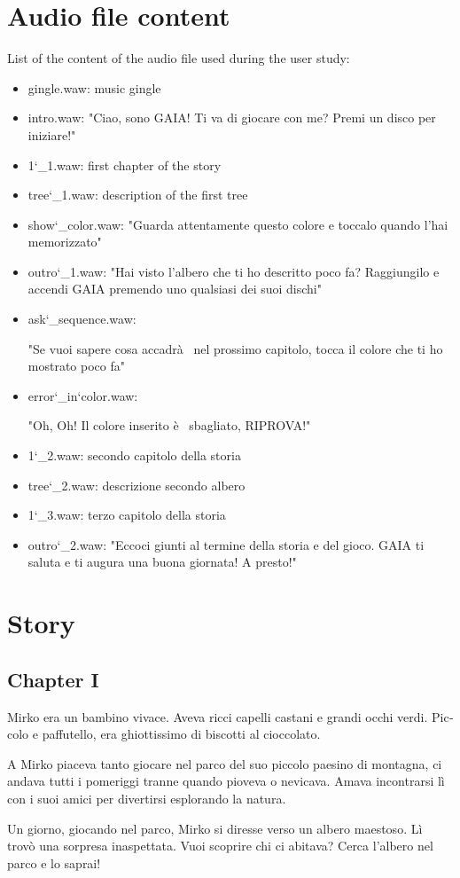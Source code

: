 \documentclass[a4paper,11pt]{report}
\begin{document}
\section{Audio file content}
List of the content of the audio file used during the user study:
\begin{itemize}
\item gingle.waw: music gingle
\item intro.waw: "Ciao, sono GAIA! Ti va di giocare con me? Premi un disco per iniziare!"
\item 1\char`_1.waw: first chapter of the story
\item tree\char`_1.waw: description of the first tree 
\item show\char`_color.waw: "Guarda attentamente questo colore e toccalo quando l'hai memorizzato"
\item outro\char`_1.waw: "Hai visto l'albero che ti ho descritto poco fa? Raggiungilo e accendi GAIA premendo uno qualsiasi dei suoi dischi"
\item ask\char`_sequence.waw: \begin{otherlanguage}{italian} "Se vuoi sapere cosa accadr\`a~ nel prossimo capitolo, tocca il colore che ti ho mostrato poco fa"\end{otherlanguage}
\item error\char`_in\char`color.waw: \begin{otherlanguage}{italian}"Oh, Oh! Il colore inserito \`e~ sbagliato, RIPROVA!"\end{otherlanguage}
\item 1\char`_2.waw: secondo capitolo della storia
\item tree\char`_2.waw: descrizione secondo albero
\item 1\char`_3.waw: terzo capitolo della storia
\item outro\char`_2.waw: "Eccoci giunti al termine della storia e del gioco. GAIA ti saluta e ti augura una buona giornata! A presto!"
\end{itemize}

\section{Story}
\subsection{Chapter I}
\begin{otherlanguage}{italian}
Mirko era un bambino vivace. Aveva ricci capelli castani e grandi occhi verdi. Piccolo e paffutello, era ghiottissimo di biscotti al cioccolato.\par
A Mirko piaceva tanto giocare nel parco del suo piccolo paesino di montagna, ci andava tutti i pomeriggi tranne quando pioveva o nevicava. Amava incontrarsi l\`i con i suoi amici per divertirsi esplorando la natura.\par 
Un giorno, giocando nel parco, Mirko si diresse verso un albero maestoso. L\`i trov\`o una sorpresa inaspettata. Vuoi scoprire chi ci abitava? Cerca l'albero nel parco e lo saprai!
\end{otherlanguage}
\end{document}
